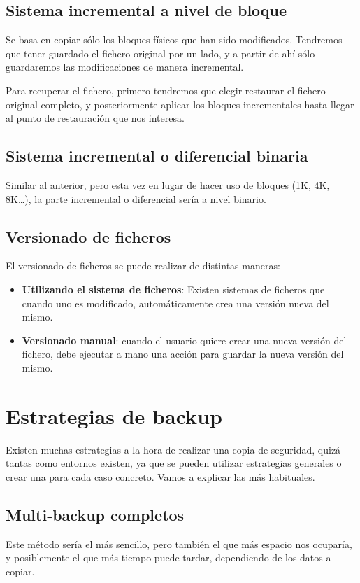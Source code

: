 \subsection{Sistema incremental a nivel de bloque}
Se basa en copiar sólo los bloques físicos que han sido modificados. Tendremos que tener guardado el fichero original por un lado, y a partir de ahí sólo guardaremos las modificaciones de manera incremental.

Para recuperar el fichero, primero tendremos que elegir restaurar el fichero original completo, y posteriormente aplicar los bloques incrementales hasta llegar al punto de restauración que nos interesa.

\subsection{Sistema incremental o diferencial binaria}
Similar al anterior, pero esta vez en lugar de hacer uso de bloques (1K, 4K, 8K…), la parte incremental o diferencial sería a nivel binario.

\subsection{Versionado de ficheros}
El versionado de ficheros se puede realizar de distintas maneras:

\begin{itemize}
    \item \textbf{Utilizando el sistema de ficheros}: Existen sistemas de ficheros que cuando uno es modificado, automáticamente crea una versión nueva del mismo.
    \item \textbf{Versionado manual}: cuando el usuario quiere crear una nueva versión del fichero, debe ejecutar a mano una acción para guardar la nueva versión del mismo.
\end{itemize}

\section{Estrategias de backup}
Existen muchas estrategias a la hora de realizar una copia de seguridad, quizá tantas como entornos existen, ya que se pueden utilizar estrategias generales o crear una para cada caso concreto. Vamos a explicar las más habituales.

\subsection{Multi-backup completos}
Este método sería el más sencillo, pero también el que más espacio nos ocuparía, y posiblemente el que más tiempo puede tardar, dependiendo de los datos a copiar.

